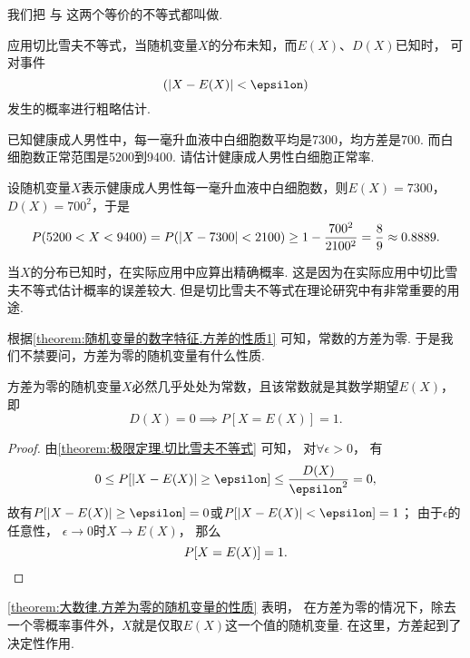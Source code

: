 我们把 
与 
这两个等价的不等式都叫做.

应用切比雪夫不等式，当随机变量\(X\)的分布未知，而\(E(X)\)、\(D(X)\)已知时，
可对事件\begin{equation*}
(\abs{X-E(X)}<\epsilon)
\end{equation*}发生的概率进行粗略估计.

\begin{example}
已知健康成人男性中，每一毫升血液中白细胞数平均是7300，均方差是700.
而白细胞数正常范围是5200到9400.
请估计健康成人男性白细胞正常率.
\begin{solution}
设随机变量\(X\)表示健康成人男性每一毫升血液中白细胞数，则\(E(X) = 7300\)，\(D(X) = 700^2\)，于是\begin{equation*}
P(5200 < X < 9400)
= P(\abs{X - 7300} < 2100)
\geq 1 - \frac{700^2}{2100^2} = \frac{8}{9}
\approx 0.8889.
\end{equation*}
\end{solution}
\end{example}

当\(X\)的分布已知时，在实际应用中应算出精确概率.
这是因为在实际应用中切比雪夫不等式估计概率的误差较大.
但是切比雪夫不等式在理论研究中有非常重要的用途.

根据\cref{theorem:随机变量的数字特征.方差的性质1} 可知，常数的方差为零.
于是我们不禁要问，方差为零的随机变量有什么性质.
\begin{theorem}\label{theorem:大数律.方差为零的随机变量的性质}
方差为零的随机变量\(X\)必然几乎处处为常数，且该常数就是其数学期望\(E(X)\)，即\begin{equation*}
	D(X)=0 \implies P[X=E(X)]=1.
\end{equation*}
\begin{proof}
由\cref{theorem:极限定理.切比雪夫不等式} 可知，
对\(\forall\epsilon>0\)，
有\begin{equation*}
	0 \leq P[\abs{X-E(X)}\geq\epsilon]
	\leq \frac{D(X)}{\epsilon^2}
	= 0,
\end{equation*}
故有\(P[\abs{X-E(X)}\geq\epsilon] = 0\)或\(P[\abs{X-E(X)}<\epsilon] = 1\)；
由于\(\epsilon\)的任意性，
\(\epsilon\to0\)时\(X \to E(X)\)，
那么\begin{equation*}
	P[X=E(X)]=1.
	\qedhere
\end{equation*}
\end{proof}
\end{theorem}
\cref{theorem:大数律.方差为零的随机变量的性质} 表明，
在方差为零的情况下，除去一个零概率事件外，\(X\)就是仅取\(E(X)\)这一个值的随机变量.
在这里，方差起到了决定性作用.

